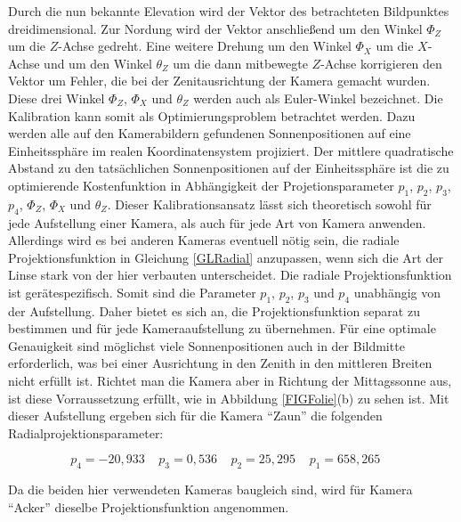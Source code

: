 \documentclass[a4paper,11pt,twoside,german]{article}
\newcommand{\absatz}{\smallbreak} %
\begin{document}
Durch die nun bekannte Elevation wird der Vektor des betrachteten Bildpunktes
dreidimensional. Zur Nordung wird der Vektor anschließend um den Winkel $\Phi_Z$
um die $Z$-Achse gedreht. Eine weitere Drehung um den Winkel $\Phi_X$ um die
$X$-Achse und um den Winkel $\theta_Z$ um die dann mitbewegte $Z$-Achse
korrigieren den Vektor um Fehler, die bei der Ze\-nit\-aus\-rich\-tung der
Kamera gemacht wurden. Diese drei Winkel $\Phi_Z$, $\Phi_X$ und $\theta_Z$
werden auch als Euler-Winkel bezeichnet.
\absatz
Die Kalibration kann somit als Optimierungsproblem betrachtet werden. Dazu
werden alle auf den Kamerabildern gefundenen Sonnenpositionen auf eine
Einheitssphäre im realen Koordinatensystem projiziert. Der mittlere quadratische
Abstand zu den tatsächlichen Sonnenpositionen auf der Einheitssphäre ist die zu
optimierende Kostenfunktion in Ab\-häng\-ig\-keit der Projetionsparameter $p_1$,
$p_2$, $p_3$, $p_4$, $\Phi_Z$, $\Phi_X$ und $\theta_Z$.
\absatz
Dieser Kalibrationsansatz lässt sich theoretisch sowohl für jede Aufstellung
einer Kamera, als auch für jede Art von Kamera anwenden. Allerdings wird es bei
anderen Kameras eventuell nötig sein, die radiale Projektionsfunktion in
Gleichung \ref{GLRadial} anzupassen, wenn sich die Art der Linse stark von der
hier verbauten unterscheidet.
\absatz
Die radiale Projektionsfunktion ist gerätespezifisch. Somit sind die Parameter 
$p_1$, $p_2$, $p_3$ und $p_4$ unabhängig von der Aufstellung. Daher bietet es
sich an, die Projektionsfunktion separat zu bestimmen und für jede
Kameraaufstellung zu übernehmen. Für eine optimale Genauigkeit sind
möglichst viele Sonnenpositionen auch in der Bildmitte erforderlich, was bei
einer Ausrichtung in den Zenith in den mittleren Breiten nicht erfüllt ist.
Richtet man die Kamera aber in Richtung der Mittagssonne aus, ist diese
Vorraussetzung erfüllt, wie in Abbildung \ref{FIGFolie}(b) zu sehen ist.
Mit dieser Aufstellung ergeben sich für die Kamera \enquote{Zaun} 
die folgenden Radialprojektionsparameter:

\begin{equation}
p_4 = -20,933 \;\;\;\;
p_3 = 0,536   \;\;\;\;
p_2 = 25,295  \;\;\;\;
p_1 = 658,265 \;\;\;\;
\end{equation}

Da die beiden hier verwendeten Kameras baugleich sind, wird für Kamera
\enquote{Acker} dieselbe Projektionsfunktion angenommen.
\end{document}
